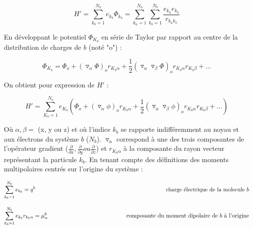 \begin{equation}
H' = \sum_{k_{b}=1}^{N_{b}} e_{k_{b}} \Phi_{k_{b}} = \sum_{k_{a}=1}^{N_{a}} \sum_{k_{b}=1}^{N_{b}} \frac{e_{k_{a}} e_{k_{b}}}{r_{k_{a}k_{b}}}
\end{equation}
	
En développant le potentiel $\Phi_{K_{b}}$ en série de Taylor par rapport au centre de la distribution de charges de $b$ (noté "o") :
	
\begin{equation}
\Phi_{K_{b}} = \Phi_{o} + (\triangledown_{\alpha} \Phi)_{o} r_{K_{b}\alpha} + \frac{1}{2} (\triangledown_{\alpha} \triangledown_{\beta} \Phi)_{o} r_{K_{b}\alpha} r_{K_{b}\beta} + \ldots
\end{equation}
	
On obtient pour expression de $H'$ : 
	
\begin{equation}
H' = \sum_{K_{b}=1}^{N_{b}} e_{K_{b}} \left(\Phi_{o} + (\triangledown_{\alpha} \phi)_{o} r_{K_{b}\alpha} + \frac{1}{2}(\triangledown_{\alpha} \triangledown_{\beta}\phi)_{o} r_{K_{b}\alpha} r_{K_{b}\beta} + \ldots \right)
\end{equation}

Où $\alpha,\beta=$ (x, y ou z) et où l'indice $k_{b}$ se rapporte indifféremment au noyau et aux électrons du système $b$ ($N_{b}$). $\triangledown_{\alpha}$ correspond à une des trois composantes de l'opérateur gradient ($\frac{\partial}{\partial x}, \frac{\partial}{\partial y} ou \frac{\partial}{\partial z}$) et $r_{K_{b}\alpha}$ à la composante du rayon vecteur représentant la particule $k_{b}$. En tenant compte des définitions des moments multipolaires centrés sur l'origine du système : 
	
\begin{flushleft}
	\begin{equation*}
	\sum_{k_{b}=1}^{N_{b}} e_{k_{b}} = q^{b} \hspace{8.1cm}\textup{charge électrique de la molecule $b$}     
	\end{equation*}
\end{flushleft}
	
\begin{flushleft}
	\begin{equation*}
	\sum_{k_{b}=1}^{N_{b}} e_{k_{b}} r_{k_{b}\alpha} = \mu_{\alpha}^{b}  \hspace{4.8cm} \textup{composante du moment dipolaire de $b$ à l'origine}
	\end{equation*}
\end{flushleft}
	

